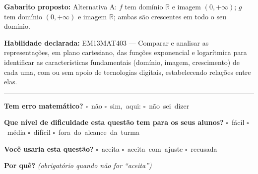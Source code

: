 \documentclass[11pt,a4paper]{article}
\begin{document}
\begin{samepage}
\textbf{Gabarito proposto:} Alternativa A: $f$ tem domínio $\mathbb{R}$ e imagem $(0,+\infty)$; $g$ tem domínio $(0,+\infty)$ e imagem $\mathbb{R}$; ambas são crescentes em todo o seu domínio.

\textbf{Habilidade declarada:} EM13MAT403 --- Comparar e analisar as representações, em plano cartesiano, das funções exponencial e logarítmica para identificar as características fundamentais (domínio, imagem, crescimento) de cada uma, com ou sem apoio de tecnologias digitais, estabelecendo relações entre elas.
\end{samepage}

\noindent\rule{\linewidth}{0.4pt}
\textbf{Tem erro matemático?}\quad
\mbox{$\square$~não} \quad \mbox{$\square$~sim, aqui:} \underline{\hspace{5cm}}
\quad \mbox{$\square$~não sei dizer}

\textbf{Que nível de dificuldade esta questão tem para os seus alunos?}\quad
\mbox{$\square$~fácil} \quad \mbox{$\square$~média} \quad
\mbox{$\square$~difícil} \quad \mbox{$\square$~fora do alcance da turma}

\textbf{Você usaria esta questão?}\quad
\mbox{$\square$~aceita} \quad \mbox{$\square$~aceita com ajuste} \quad
\mbox{$\square$~recusada}

\textbf{Por quê?} \emph{(obrigatório quando não for ``aceita'')}

\underline{\hspace{\linewidth}}

\underline{\hspace{\linewidth}}
\vspace{0.6em}
\end{document}
